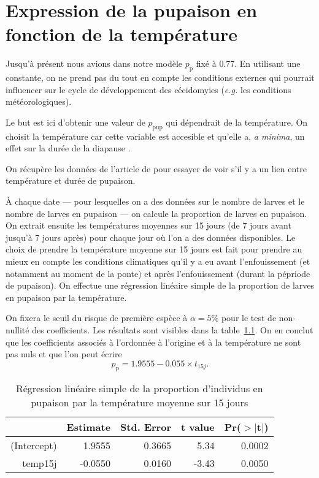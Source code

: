 \chapter{Expression de la pupaison en fonction de la température}
\label{chap:pupaison}

Jusqu'à présent nous avions dans notre modèle $p_{\text{p}}$ fixé à 0.77. 
En utilisant une constante, on ne prend pas du tout en compte les conditions externes qui pourrait influencer sur le cycle de développement des cécidomyies (\emph{e.g.} les conditions météorologiques).
 
Le but est ici d'obtenir une valeur de $p_{\text{pup}}$ qui dépendrait de la température. On choisit la température car cette variable est accesible et qu'elle a, \emph{a minima}, un effet sur la durée de la diapause \citep{pauldiap}.

On récupère les données de l'article de \citet{pauldiap} pour essayer de voir s'il y a un lien entre température et durée de pupaison.

À chaque date --- pour lesquelles on a des données sur le nombre de larves et le nombre de larves en pupaison --- on calcule la proportion de larves en pupaison.
On extrait ensuite les températures moyennes sur 15 jours (de 7 jours avant jusqu'à 7 jours après) pour chaque jour où l'on a des données disponibles.
Le choix de prendre la température moyenne sur 15 jours est fait pour prendre au mieux en compte les conditions climatiques qu'il y a eu avant l'enfouissement (et notamment au moment de la ponte) et après l'enfouissement (durant la pépriode de pupaison).
On effectue une régression linéaire simple de la proportion de larves en pupaison par la température.

On fixera le seuil du risque de première espèce à $\alpha = 5\%$ pour le test de non-nullité des coefficients.
Les résultats sont visibles dans la table~\ref{tab:lm2}.
On en conclut que les coefficients associés à l'ordonnée à l'origine et à la température ne sont pas nuls et que l'on peut écrire
\[
p_{\text{p}} = 1.9555 - 0.055\times t_{15j}.
\]

\begin{table}[hb]
\centering
\caption{Régression linéaire simple de la proportion d'individus en pupaison par la température moyenne sur 15 jours}
\label{tab:lm2}
\begin{tabular}{rrrrr}
 & Estimate & Std. Error & t value & Pr($>$$|$t$|$) \\ 
  \hline
(Intercept) & 1.9555 & 0.3665 & 5.34 & 0.0002 \\ 
  temp15j & -0.0550 & 0.0160 & -3.43 & 0.0050 \\ 
\end{tabular}
\end{table}
